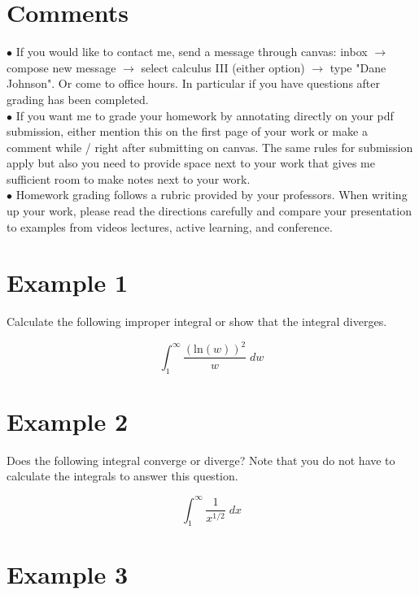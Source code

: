 \documentclass[11pt]{article}
\begin{document}
\section*{Comments}

$\bullet$ If you would like to contact me, send a message through canvas: inbox $\rightarrow$ compose new message $\rightarrow$ select calculus III (either option) $\rightarrow$ type "Dane Johnson". Or come to office hours. In particular if you have questions after grading has been completed. \\

$\bullet$ If you want me to grade your homework by annotating directly on your pdf submission, either mention this on the first page of your work or make a comment while / right after submitting on canvas. The same rules for submission apply but also you need to provide space next to your work that gives me sufficient room to make notes next to your work.\\

$\bullet$ Homework grading follows a rubric provided by your professors. When writing up your work, please read the directions carefully and compare your presentation to examples from videos lectures, active learning, and conference. 

\newpage 



\section*{Example 1}

Calculate the following improper integral or show that the integral diverges.

$$\int_{1}^{\infty} \frac{(\text{ln}(w))^2}{w} \; dw$$

\newpage

\section*{Example 2}

Does the following integral converge or diverge? Note that you do not have to calculate the integrals to answer this question.

$$\int_{1}^{\infty} \frac{1}{x^{1/2}} \; dx$$


\newpage

\section*{Example 3}
\end{document}
